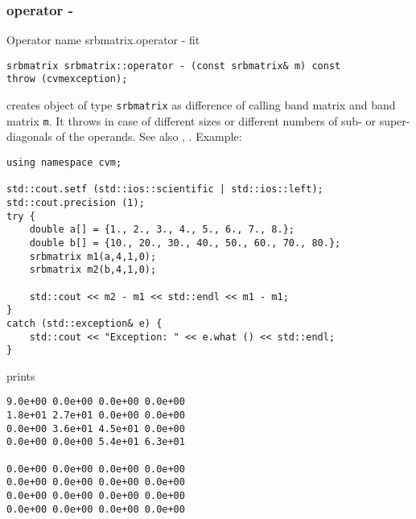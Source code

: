 \subsubsection{operator -}
Operator%
\pdfdest name {srbmatrix.operator -} fit
\begin{verbatim}
srbmatrix srbmatrix::operator - (const srbmatrix& m) const
throw (cvmexception);
\end{verbatim}
creates  object of type \verb"srbmatrix" as  difference of
 calling band matrix and  band matrix \verb"m".
It throws  
in case of different sizes or different numbers of sub- or super-diagonals
of the operands.
See also , .
Example:
\begin{Verbatim}
using namespace cvm;

std::cout.setf (std::ios::scientific | std::ios::left); 
std::cout.precision (1);
try {
    double a[] = {1., 2., 3., 4., 5., 6., 7., 8.};
    double b[] = {10., 20., 30., 40., 50., 60., 70., 80.};
    srbmatrix m1(a,4,1,0);
    srbmatrix m2(b,4,1,0);

    std::cout << m2 - m1 << std::endl << m1 - m1;
}
catch (std::exception& e) {
    std::cout << "Exception: " << e.what () << std::endl;
}
\end{Verbatim}
prints
\begin{Verbatim}
9.0e+00 0.0e+00 0.0e+00 0.0e+00
1.8e+01 2.7e+01 0.0e+00 0.0e+00
0.0e+00 3.6e+01 4.5e+01 0.0e+00
0.0e+00 0.0e+00 5.4e+01 6.3e+01

0.0e+00 0.0e+00 0.0e+00 0.0e+00
0.0e+00 0.0e+00 0.0e+00 0.0e+00
0.0e+00 0.0e+00 0.0e+00 0.0e+00
0.0e+00 0.0e+00 0.0e+00 0.0e+00
\end{Verbatim}
\newpage






